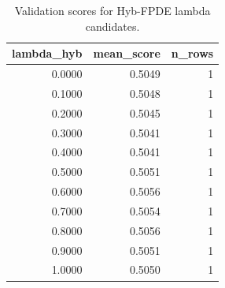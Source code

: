 \begin{table}[t]
\caption{Validation scores for Hyb-FPDE lambda candidates.}
\label{tab:lambda_distribution_computed}
\centering
\begin{tabular}{rrr}
\toprule
lambda\_hyb & mean\_score & n\_rows \\
\midrule
0.0000 & 0.5049 & 1 \\
0.1000 & 0.5048 & 1 \\
0.2000 & 0.5045 & 1 \\
0.3000 & 0.5041 & 1 \\
0.4000 & 0.5041 & 1 \\
0.5000 & 0.5051 & 1 \\
0.6000 & 0.5056 & 1 \\
0.7000 & 0.5054 & 1 \\
0.8000 & 0.5056 & 1 \\
0.9000 & 0.5051 & 1 \\
1.0000 & 0.5050 & 1 \\
\bottomrule
\end{tabular}

\end{table}
